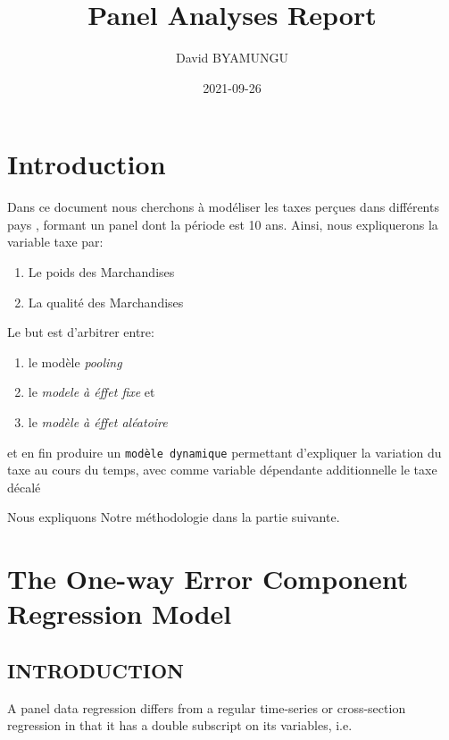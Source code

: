 \documentclass[
]{book}
\title{Panel Analyses Report}
\author{David BYAMUNGU}
\date{2021-09-26}
\providecommand{\tightlist}{%
  \setlength{\itemsep}{0pt}\setlength{\parskip}{0pt}}
\begin{document}
\maketitle

{
\setcounter{tocdepth}{1}
\tableofcontents
}
\hypertarget{intro}{%
\chapter{Introduction}\label{intro}}

Dans ce document nous cherchons à modéliser les taxes perçues dans différents pays , formant un panel dont la période est 10 ans.
Ainsi, nous expliquerons la variable taxe par:

\begin{enumerate}
\def\labelenumi{(\arabic{enumi})}
\tightlist
\item
  Le poids des Marchandises
\item
  La qualité des Marchandises
\end{enumerate}

Le but est d'arbitrer entre:

\begin{enumerate}
\def\labelenumi{(\arabic{enumi})}
\tightlist
\item
  le modèle \emph{pooling}
\item
  le \emph{modele à éffet fixe} et
\item
  le \emph{modèle à éffet aléatoire}
\end{enumerate}

et en fin produire un \texttt{modèle\ dynamique} permettant d'expliquer la variation du taxe au cours du temps, avec comme variable dépendante additionnelle le taxe décalé

Nous expliquons Notre méthodologie dans la partie suivante.

\hypertarget{the-one-way-error-component-regression-model}{%
\chapter{The One-way Error Component Regression Model}\label{the-one-way-error-component-regression-model}}

\hypertarget{introduction}{%
\section{INTRODUCTION}\label{introduction}}

A panel data regression differs from a regular time-series or cross-section regression in that it has a double subscript on its variables, i.e.
\end{document}
